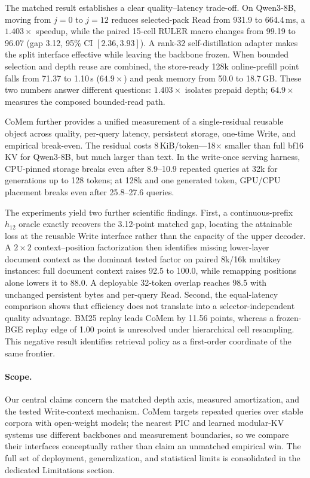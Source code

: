 The matched result establishes a clear quality--latency trade-off. On
Qwen3-8B, moving from $j{=}0$ to $j{=}12$ reduces selected-pack Read from
931.9 to 664.4\,ms, a $1.403\times$ speedup, while the paired 15-cell RULER
macro changes from 99.19 to 96.07 (gap 3.12, 95\% CI $[2.36,3.93]$). A
rank-32 self-distillation adapter makes the split interface effective while
leaving the backbone frozen. When bounded selection and depth reuse are
combined, the store-ready 128k online-prefill point falls from 71.37 to
1.10\,s ($64.9\times$) and peak memory from 50.0 to 18.7\,GB. These two
numbers answer different questions: $1.403\times$ isolates prepaid depth;
$64.9\times$ measures the composed bounded-read path.

CoMem further provides a unified measurement of a
single-residual reusable object across quality, per-query latency, persistent
storage, one-time Write, and empirical break-even. The residual costs
8\,KiB/token---18$\times$ smaller than full bf16 KV for Qwen3-8B, but much
larger than text. In the write-once serving harness, CPU-pinned storage breaks
even after 8.9--10.9 repeated queries at 32k for generations up to 128 tokens;
at 128k and one generated token, GPU/CPU placement breaks even after
25.8--27.6 queries.

The experiments yield two further scientific findings. First, a
continuous-prefix $h_{12}$ oracle exactly recovers the 3.12-point matched gap,
locating the attainable loss at the reusable Write interface rather than the
capacity of the upper decoder. A $2{\times}2$ context--position factorization
then identifies missing lower-layer document context as the dominant tested
factor on paired 8k/16k multikey instances: full document context raises 92.5
to 100.0, while remapping positions alone lowers it to 88.0. A deployable
32-token overlap reaches 98.5 with unchanged persistent bytes and per-query
Read. Second, the equal-latency comparison shows that efficiency does not
translate into a selector-independent quality advantage. BM25 replay leads
CoMem by 11.56 points, whereas a frozen-BGE replay edge of 1.00 point is
unresolved under hierarchical cell resampling. This negative result identifies
retrieval policy as a first-order coordinate of the same frontier.

\paragraph{Scope.}
Our central claims concern the matched depth axis, measured amortization, and
the tested Write-context mechanism. CoMem targets repeated queries over stable
corpora with open-weight models; the nearest PIC and learned modular-KV systems
use different backbones and measurement boundaries, so we compare their
interfaces conceptually rather than claim an unmatched empirical win. The full
set of deployment, generalization, and statistical limits is consolidated in
the dedicated Limitations section.

